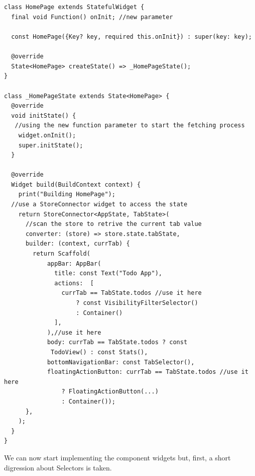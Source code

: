 \begin{code}
\mbox{}\\
 \mbox{}
		\label{code:2.14}
\begin{verbatim}

class HomePage extends StatefulWidget {
  final void Function() onInit; //new parameter

  const HomePage({Key? key, required this.onInit}) : super(key: key);

  @override
  State<HomePage> createState() => _HomePageState();
}

class _HomePageState extends State<HomePage> {
  @override
  void initState() {
   //using the new function parameter to start the fetching process
    widget.onInit();
    super.initState();
  }

  @override
  Widget build(BuildContext context) {
    print("Building HomePage");
  //use a StoreConnector widget to access the state
    return StoreConnector<AppState, TabState>(
      //scan the store to retrive the current tab value
      converter: (store) => store.state.tabState,
      builder: (context, currTab) {
        return Scaffold(
            appBar: AppBar(
              title: const Text("Todo App"),
              actions:  [
                currTab == TabState.todos //use it here
                    ? const VisibilityFilterSelector()
                    : Container()
              ],
            ),//use it here
            body: currTab == TabState.todos ? const
             TodoView() : const Stats(),
            bottomNavigationBar: const TabSelector(),
            floatingActionButton: currTab == TabState.todos //use it here
                ? FloatingActionButton(...)
                : Container());
      },
    );
  }
}
\end{verbatim}
\mbox{}
\end{code}

We can now start implementing the component widgets but, first, a short digression about Selectors is taken.
